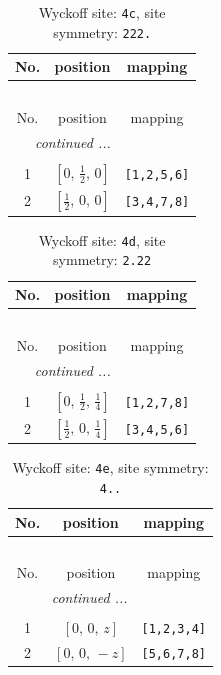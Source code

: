 \documentclass[fleqn,8pt]{jsarticle}
\begin{document}
\begin{longtable}{ccc}
\caption{Wyckoff site: {\tt 4c}, site symmetry: {\tt 222.}}
 \\
 \hline \hline
No. & position & mapping \\ \hline \endfirsthead

\multicolumn{2}{l}{\tablename\ \thetable{}} \\
 \hline \hline
No. & position & mapping \\ \hline \endhead

 \hline \hline
\multicolumn{2}{r}{\footnotesize\it continued ...} \\ \endfoot

 \hline \hline
\multicolumn{2}{r}{} \\ \endlastfoot

1 & $\left[ 0,\, \frac{1}{2},\, 0 \right]$ & {\tt [1,2,5,6]} \\ \hline
2 & $\left[ \frac{1}{2},\, 0,\, 0 \right]$ & {\tt [3,4,7,8]} \\
\end{longtable}
\renewcommand{\arraystretch}{1.2}
\begin{longtable}{ccc}
\caption{Wyckoff site: {\tt 4d}, site symmetry: {\tt 2.22}}
 \\
 \hline \hline
No. & position & mapping \\ \hline \endfirsthead

\multicolumn{2}{l}{\tablename\ \thetable{}} \\
 \hline \hline
No. & position & mapping \\ \hline \endhead

 \hline \hline
\multicolumn{2}{r}{\footnotesize\it continued ...} \\ \endfoot

 \hline \hline
\multicolumn{2}{r}{} \\ \endlastfoot

1 & $\left[ 0,\, \frac{1}{2},\, \frac{1}{4} \right]$ & {\tt [1,2,7,8]} \\ \hline
2 & $\left[ \frac{1}{2},\, 0,\, \frac{1}{4} \right]$ & {\tt [3,4,5,6]} \\
\end{longtable}
\renewcommand{\arraystretch}{1.2}
\begin{longtable}{ccc}
\caption{Wyckoff site: {\tt 4e}, site symmetry: {\tt 4..}}
 \\
 \hline \hline
No. & position & mapping \\ \hline \endfirsthead

\multicolumn{2}{l}{\tablename\ \thetable{}} \\
 \hline \hline
No. & position & mapping \\ \hline \endhead

 \hline \hline
\multicolumn{2}{r}{\footnotesize\it continued ...} \\ \endfoot

 \hline \hline
\multicolumn{2}{r}{} \\ \endlastfoot

1 & $\left[ 0,\, 0,\, z \right]$ & {\tt [1,2,3,4]} \\ \hline
2 & $\left[ 0,\, 0,\, - z \right]$ & {\tt [5,6,7,8]} \\
\end{longtable}
\end{document}
